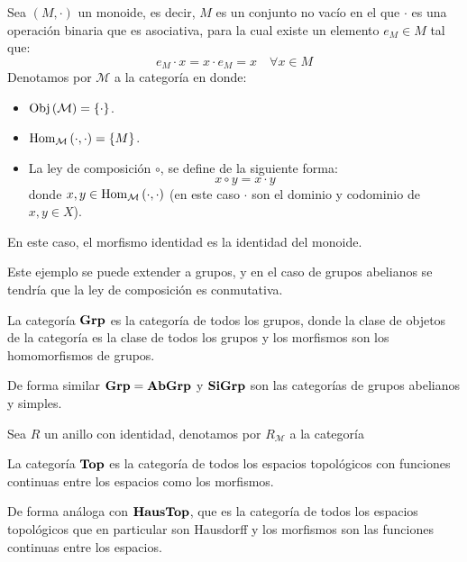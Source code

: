 \documentclass[12pt]{report}
\theoremstyle{largebreak}
\newcommand{\Obj}[1]{\ensuremath{\textup{Obj}\left(#1\right)}}
\newcommand{\Hom}[3]{\ensuremath{\textup{Hom}_{#1}\left(#2,#3\right)}}
\newcommand{\Cat}[1]{\ensuremath{\textup{\textbf{#1}}}}
\begin{document}
    \begin{exa}
        Sea $(M,\cdot)$ un monoide, es decir, $M$ es un conjunto no vacío en el que $\cdot$ es una operación binaria que es asociativa, para la cual existe un elemento $e_M\in M$ tal que:
        \begin{equation*}
            e_M\cdot x=x\cdot e_M=x\quad\forall x\in M
        \end{equation*}
        Denotamos por $\mathcal{M}$ a la categoría en donde:
        \begin{itemize}
            \item $\Obj{\mathcal{M}}=\left\{\cdot \right\}$.
            \item $\Hom{\mathcal{M}}{\cdot}{\cdot}=\left\{M \right\}$.
            \item La ley de composición $\circ$, se define de la siguiente forma:
            \begin{equation*}
                x\circ y=x\cdot y
            \end{equation*}
            donde $x,y\in \Hom{\mathcal{M}}{\cdot}{\cdot}$ (en este caso $\cdot$ son el dominio y codominio de $x,y\in X$).
        \end{itemize}
        En este caso, el morfismo identidad es la identidad del monoide.

        Este ejemplo se puede extender a grupos, y en el caso de grupos abelianos se tendría que la ley de composición es conmutativa.
    \end{exa}

    \begin{exa}
        La categoría $\Cat{Grp}$ es la categoría de todos los grupos, donde la clase de objetos de la categoría es la clase de todos los grupos y los morfismos son los homomorfismos de grupos.

        De forma similar $\Cat{Grp}=\Cat{AbGrp}$ y $\Cat{SiGrp}$ son las categorías de grupos abelianos y simples.
    \end{exa}

    \begin{exa}
        Sea $R$ un anillo con identidad, denotamos por $R_\mathcal{M}$ a la categoría
    \end{exa}

    \begin{exa}
        La categoría $\Cat{Top}$ es la categoría de todos los espacios topológicos con funciones continuas entre los espacios como los morfismos.

        De forma análoga con $\Cat{HausTop}$, que es la categoría de todos los espacios topológicos que en particular son Hausdorff y los morfismos son las funciones continuas entre los espacios.
    \end{exa}
\end{document}
